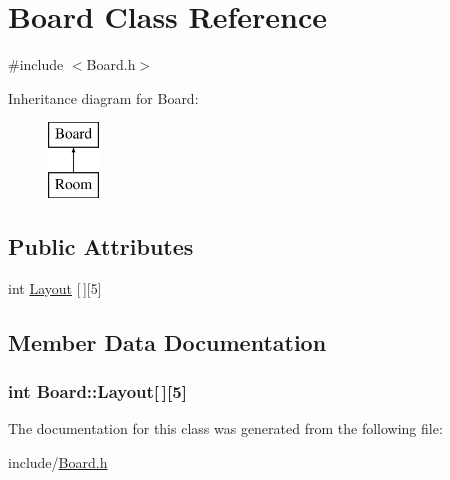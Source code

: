 \hypertarget{classBoard}{\section{Board Class Reference}
\label{classBoard}
}


{\ttfamily \#include $<$Board.\-h$>$}

Inheritance diagram for Board\-:\begin{figure}[H]
\begin{center}
\leavevmode
\includegraphics[height=2.000000cm]{classBoard}
\end{center}
\end{figure}
\subsection*{Public Attributes}
\begin{DoxyCompactItemize}
\item 
int \hyperlink{classBoard_a0a98d341c4c8f9e5ef513364f4453112}{Layout} \mbox{[}$\,$\mbox{]}\mbox{[}5\mbox{]}
\end{DoxyCompactItemize}


\subsection{Member Data Documentation}
\hypertarget{classBoard_a0a98d341c4c8f9e5ef513364f4453112}{
\subsubsection[{Layout}]{\setlength{\rightskip}{0pt plus 5cm}int Board\-::\-Layout\mbox{[}$\,$\mbox{]}\mbox{[}5\mbox{]}}}\label{classBoard_a0a98d341c4c8f9e5ef513364f4453112}


The documentation for this class was generated from the following file\-:\begin{DoxyCompactItemize}
\item 
include/\hyperlink{Board_8h}{Board.\-h}\end{DoxyCompactItemize}
